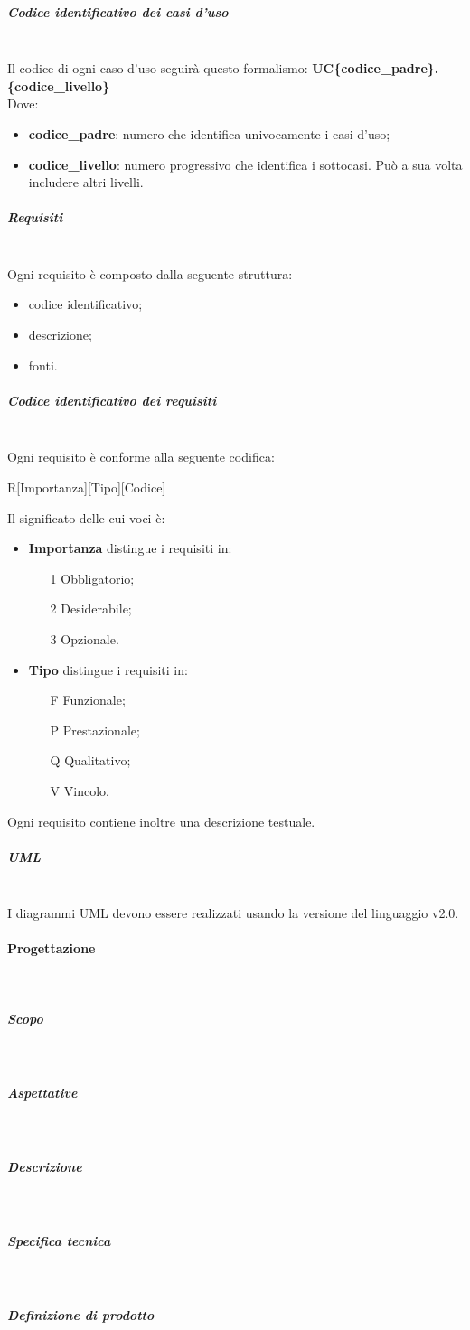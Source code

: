 \subparagraph{Codice identificativo dei casi d'uso} \mbox{}\\
Il codice di ogni caso d'uso seguirà questo formalismo:
\textbf{UC\{codice\_padre\}.\{codice\_livello\}} \\
Dove:
\begin{itemize}
	\item \textbf{codice\_padre}: numero che identifica univocamente i casi d'uso;
	\item \textbf{codice\_livello}: numero progressivo che identifica i sottocasi. Può a sua volta includere altri livelli.
\end{itemize}
\subparagraph{Requisiti} \mbox{}\\
Ogni requisito è composto dalla seguente struttura:
\begin{itemize}
	\item codice identificativo;
	\item descrizione;
	\item fonti.
\end{itemize}
\subparagraph{Codice identificativo dei requisiti} \mbox{}\\
Ogni requisito è conforme alla seguente codifica:\newline
\centerline{R[Importanza][Tipo][Codice]}\newline
Il significato delle cui voci è:
\begin{itemize}
	\item \textbf{Importanza} distingue i requisiti in:
	\begin{itemize}
		\item[1] Obbligatorio;
		\item[2] Desiderabile;
		\item[3] Opzionale.
	\end{itemize}
	\item \textbf{Tipo} distingue i requisiti in:
	\begin{itemize}
		\item[F] Funzionale;
		\item[P] Prestazionale;
		\item[Q] Qualitativo;
		\item[V] Vincolo.
	\end{itemize}
\end{itemize}
Ogni requisito contiene inoltre una descrizione testuale.
\subparagraph{UML} \mbox{}\\
I diagrammi UML devono essere realizzati usando la versione del linguaggio v2.0.
\paragraph{Progettazione} \mbox{}\\
\subparagraph{Scopo} \mbox{}\\
\subparagraph{Aspettative} \mbox{}\\
\subparagraph{Descrizione} \mbox{}\\
\subparagraph{Specifica tecnica} \mbox{}\\
\subparagraph{Definizione di prodotto} \mbox{}\\

